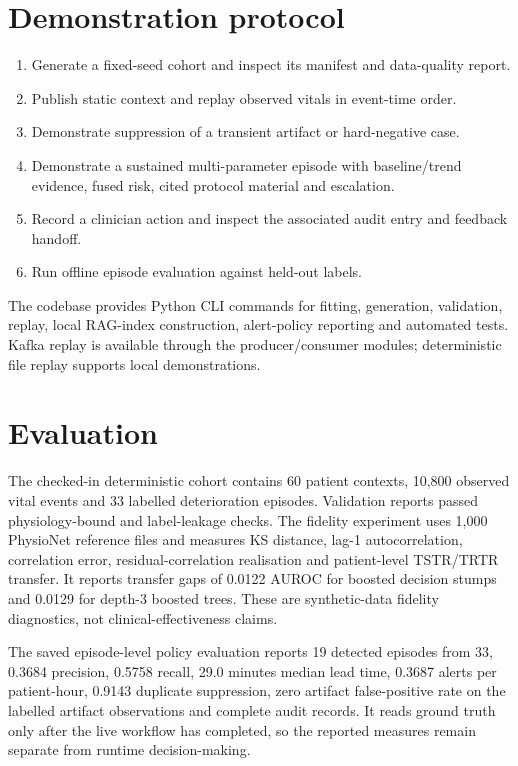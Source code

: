 \documentclass[11pt,a4paper]{article}
\begin{document}
\section{Demonstration protocol}
\begin{enumerate}[nosep]
\item Generate a fixed-seed cohort and inspect its manifest and data-quality report.
\item Publish static context and replay observed vitals in event-time order.
\item Demonstrate suppression of a transient artifact or hard-negative case.
\item Demonstrate a sustained multi-parameter episode with baseline/trend evidence, fused risk, cited protocol material and escalation.
\item Record a clinician action and inspect the associated audit entry and feedback handoff.
\item Run offline episode evaluation against held-out labels.
\end{enumerate}
The codebase provides Python CLI commands for fitting, generation, validation, replay, local RAG-index construction, alert-policy reporting and automated tests. Kafka replay is available through the producer/consumer modules; deterministic file replay supports local demonstrations.

\section{Evaluation}
The checked-in deterministic cohort contains 60 patient contexts, 10,800 observed vital events and 33 labelled deterioration episodes. Validation reports passed physiology-bound and label-leakage checks. The fidelity experiment uses 1,000 PhysioNet reference files and measures KS distance, lag-1 autocorrelation, correlation error, residual-correlation realisation and patient-level TSTR/TRTR transfer. It reports transfer gaps of 0.0122 AUROC for boosted decision stumps and 0.0129 for depth-3 boosted trees. These are synthetic-data fidelity diagnostics, not clinical-effectiveness claims.

The saved episode-level policy evaluation reports 19 detected episodes from 33, 0.3684 precision, 0.5758 recall, 29.0 minutes median lead time, 0.3687 alerts per patient-hour, 0.9143 duplicate suppression, zero artifact false-positive rate on the labelled artifact observations and complete audit records. It reads ground truth only after the live workflow has completed, so the reported measures remain separate from runtime decision-making.
\end{document}
